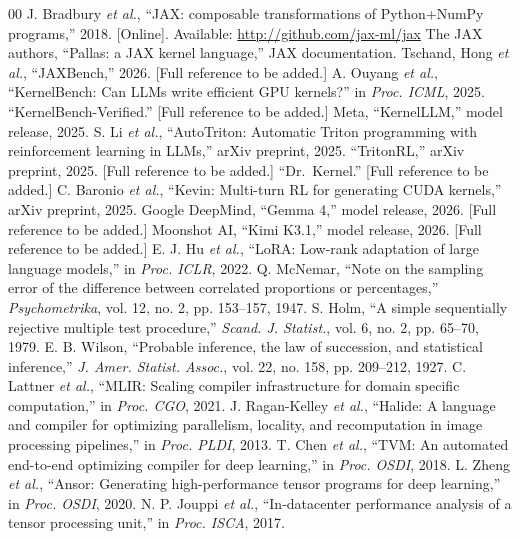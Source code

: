 \documentclass[conference]{IEEEtran}
\begin{document}
\begin{thebibliography}{00}
 J. Bradbury \emph{et al.}, ``JAX: composable transformations of Python+NumPy programs,'' 2018. [Online].
Available: \url{http://github.com/jax-ml/jax}
 The JAX authors, ``Pallas: a JAX kernel language,'' JAX documentation.
 Tschand, Hong \emph{et al.}, ``JAXBench,'' 2026. [Full reference to be added.]
 A. Ouyang \emph{et al.}, ``KernelBench: Can LLMs write efficient GPU kernels?'' in \emph{Proc. ICML}, 2025.
 ``KernelBench-Verified.'' [Full reference to be added.]
 Meta, ``KernelLLM,'' model release, 2025.
 S. Li \emph{et al.}, ``AutoTriton: Automatic Triton programming with reinforcement learning in LLMs,''
arXiv preprint, 2025.
 ``TritonRL,'' arXiv preprint, 2025. [Full reference to be added.]
 ``Dr.~Kernel.'' [Full reference to be added.]
 C. Baronio \emph{et al.}, ``Kevin: Multi-turn RL for generating CUDA kernels,'' arXiv preprint, 2025.
 Google DeepMind, ``Gemma 4,'' model release, 2026. [Full reference to be added.]
 Moonshot AI, ``Kimi K3.1,'' model release, 2026. [Full reference to be added.]
 E. J. Hu \emph{et al.}, ``LoRA: Low-rank adaptation of large language models,'' in \emph{Proc. ICLR}, 2022.
 Q. McNemar, ``Note on the sampling error of the difference between correlated proportions or percentages,''
\emph{Psychometrika}, vol. 12, no. 2, pp. 153--157, 1947.
 S. Holm, ``A simple sequentially rejective multiple test procedure,'' \emph{Scand. J. Statist.}, vol. 6, no. 2,
pp. 65--70, 1979.
 E. B. Wilson, ``Probable inference, the law of succession, and statistical inference,'' \emph{J. Amer.
Statist. Assoc.}, vol. 22, no. 158, pp. 209--212, 1927.
 C. Lattner \emph{et al.}, ``MLIR: Scaling compiler infrastructure for domain specific computation,'' in \emph{Proc. CGO}, 2021.
 J. Ragan-Kelley \emph{et al.}, ``Halide: A language and compiler for optimizing parallelism, locality, and
recomputation in image processing pipelines,'' in \emph{Proc. PLDI}, 2013.
 T. Chen \emph{et al.}, ``TVM: An automated end-to-end optimizing compiler for deep learning,'' in \emph{Proc. OSDI}, 2018.
 L. Zheng \emph{et al.}, ``Ansor: Generating high-performance tensor programs for deep learning,'' in \emph{Proc. OSDI}, 2020.
 N. P. Jouppi \emph{et al.}, ``In-datacenter performance analysis of a tensor processing unit,'' in \emph{Proc. ISCA}, 2017.

\end{thebibliography}
\end{document}
